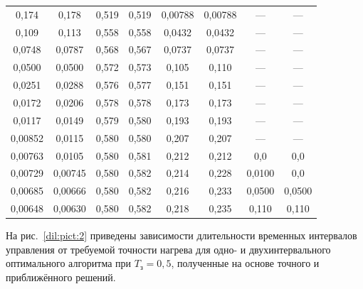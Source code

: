 \begin{table}
\begin{tabular}{c|c|c|c|c|c|c|c}
0,174\phantom{00}& 0,178\phantom{00}&0,519&0,519&0,00788\phantom{0}&0,00788\phantom{0}&---&--- \\ 

0,109\phantom{00}& 0,113\phantom{00}&0,558&0,558&0,0432\phantom{00} &0,0432\phantom{00}&---&--- \\

0,0748\phantom{0}& 0,0787\phantom{0}&0,568&0,567&0,0737\phantom{00}&0,0737\phantom{00}&---&--- \\ 

0,0500\phantom{0}& 0,0500\phantom{0}&0,572&0,573&0,105\phantom{000}&0,110\phantom{000}&---&--- \\ 

0,0251\phantom{0}& 0,0288\phantom{0}&0,576&0,577&0,151\phantom{000}&0,151\phantom{000}&---&--- \\ 

0,0172\phantom{0}& 0,0206\phantom{0}&0,578&0,578&0,173\phantom{000}&0,173\phantom{000}&---&--- \\ 

0,0117\phantom{0}& 0,0149\phantom{0}&0,579&0,580&0,193\phantom{000}&0,193\phantom{000}&---&--- \\ 

0,00852& 0,0115\phantom{0}&0,580&0,580&0,207\phantom{000}&0,207\phantom{000}&---&--- \\ 

0,00763& 0,0105\phantom{0}&0,580&0,581&0,212\phantom{000}&0,212\phantom{000}&0,0\phantom{000}&0,0\phantom{000} \\ 

0,00729& 0,00745&0,580&0,582&0,214\phantom{000}&0,228\phantom{000}&0,0100&0,0\phantom{000} \\ 

0,00685&0,00666&0,580&0,582&0,216\phantom{000}&0,233\phantom{000}&0,0500&0,0500 \\ 

0,00648&0,00630&0,580&0,582&0,218\phantom{000}&0,235\phantom{000}&0,110\phantom{0}&0,110\phantom{0} \\ \hline

\end{tabular}

\end{table}






На рис.~\ref{dil:pict:2} приведены зависимости длительности временных интервалов управления от требуемой точности нагрева для одно- и двухинтервального оптимального алгоритма при $T_\text{з}=0,5$, полученные на основе точного и приближённого решений.







